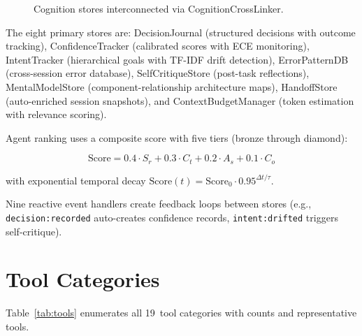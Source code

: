 \documentclass[journal,10pt]{IEEEtran}
\newcommand{\code}[1]{\texttt{#1}}
\begin{document}
\begin{figure}[!t]
{}%
\caption{Cognition stores interconnected via CognitionCrossLinker.}
\label{fig:cognition}
\end{figure}

The eight primary stores are: DecisionJournal (structured decisions with outcome tracking), ConfidenceTracker (calibrated scores with ECE monitoring), IntentTracker (hierarchical goals with TF-IDF drift detection), ErrorPatternDB (cross-session error database), SelfCritiqueStore (post-task reflections), MentalModelStore (component-relationship architecture maps), HandoffStore (auto-enriched session snapshots), and ContextBudgetManager (token estimation with relevance scoring).

Agent ranking uses a composite score with five tiers (bronze through diamond):

\begin{equation}
\text{Score} = 0.4 \cdot S_r + 0.3 \cdot C_t + 0.2 \cdot A_s + 0.1 \cdot C_o
\label{eq:rank}
\end{equation}

\noindent with exponential temporal decay $\text{Score}(t) = \text{Score}_0 \cdot 0.95^{\Delta t / \tau}$.

Nine reactive event handlers create feedback loops between stores (e.g., \code{decision:recorded} auto-creates confidence records, \code{intent:drifted} triggers self-critique).

\section{Tool Categories}
\label{sec:tools}

Table~\ref{tab:tools} enumerates all 19~tool categories with counts and representative tools.
\end{document}
